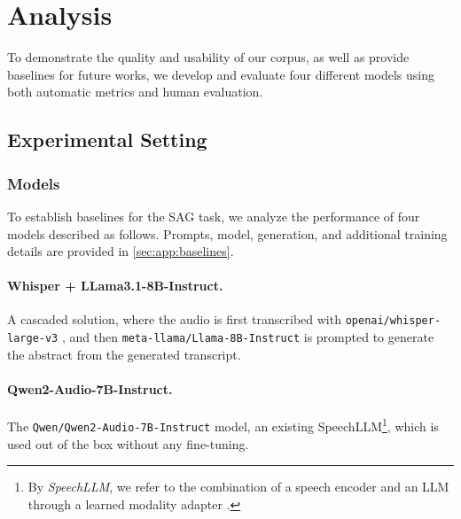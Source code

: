 \section{Analysis}

 To demonstrate the quality and usability of our corpus, as well as 
 provide baselines for future works, we 
 develop and evaluate four different models using
 both automatic metrics and
 human evaluation. 

 \subsection{Experimental Setting}\label{subsec:exp_setting}
 
 \subsubsection{Models}
To establish baselines for the SAG task, we analyze the performance of four models described as follows. Prompts, model, generation, and additional training details are provided in \cref{sec:app:baselines}.

\paragraph{Whisper + LLama3.1-8B-Instruct.}  A cascaded solution, where the audio is first transcribed with
\texttt{openai/whisper\--large\--v3} \citep{radford2022robustspeechrecognitionlargescale}, and then
\texttt{meta\--llama/\-Llama\--8B\--Instruct} \citep{dubey2024llama3herdmodels} is prompted to generate the abstract from the generated transcript.

\paragraph{Qwen2-Audio-7B-Instruct.} The \texttt{Qwen/\-Qwen2\--Audio\--7B\--Instruct} \citep{chu2024qwen2audiotechnicalreport} model, an existing SpeechLLM\footnote{By \textit{SpeechLLM}, we refer to the combination of a speech encoder and an LLM through a learned modality adapter \citep{gaido-etal-2024-speech}.}, which is used out of the box without any fine-tuning.

